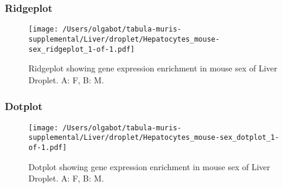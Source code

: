 \clearpage
\clearpage
\subsubsection{Ridgeplot}
\begin{figure}[h]
\centering
\texttt{[image: /Users/olgabot/tabula-muris-supplemental/Liver/droplet/Hepatocytes\_mouse-sex\_ridgeplot\_1-of-1.pdf]}

\caption{ Ridgeplot  showing gene expression enrichment in mouse sex of Liver Droplet. A: F, B: M.}
\end{figure}


\clearpage
\clearpage
\subsubsection{Dotplot}
\begin{figure}[h]
\centering
\texttt{[image: /Users/olgabot/tabula-muris-supplemental/Liver/droplet/Hepatocytes\_mouse-sex\_dotplot\_1-of-1.pdf]}

\caption{ Dotplot  showing gene expression enrichment in mouse sex of Liver Droplet. A: F, B: M.}
\end{figure}

